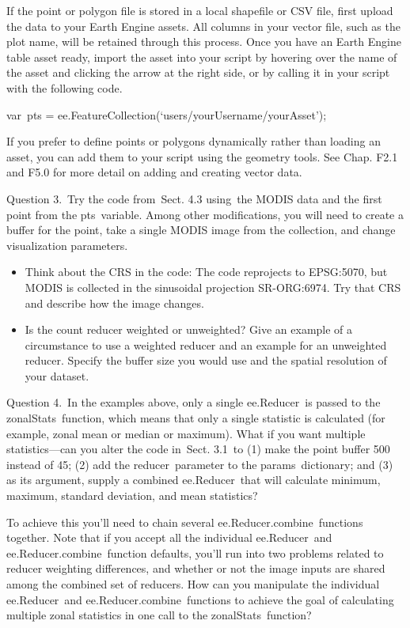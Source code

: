 \documentclass[
  letterpaper,
  DIV=11,
  numbers=noendperiod]{scrreprt}
\providecommand{\tightlist}{%
  \setlength{\itemsep}{0pt}\setlength{\parskip}{0pt}}\usepackage{longtable,booktabs,array}
\begin{document}
If the point or polygon file is stored in a local shapefile or CSV file,
first upload the data to your Earth Engine assets. All columns in your
vector file, such as the plot name, will be retained through this
process. Once you have an Earth Engine table asset ready, import the
asset into your script by hovering over the name of the asset and
clicking the arrow at the right side, or by calling it in your script
with the following code.

var~pts = ee.FeatureCollection(`users/yourUsername/yourAsset');

If you prefer to define points or polygons dynamically rather than
loading an asset, you can add them to your script using the geometry
tools. See Chap. F2.1 and F5.0 for more detail on adding and creating
vector data.

Question 3.~Try the code from~Sect. 4.3 using~the MODIS data and the
first point from the pts~variable. Among other modifications, you will
need to create a buffer for the point, take a single MODIS image from
the collection, and change visualization parameters.

\begin{itemize}
\tightlist
\item
  Think about the CRS in the code: The code reprojects to EPSG:5070, but
  MODIS is collected in the sinusoidal projection SR-ORG:6974. Try that
  CRS and describe how the image changes.
\item
  Is the count reducer weighted or unweighted? Give an example of a
  circumstance to use a weighted reducer and an example for an
  unweighted reducer. Specify the buffer size you would use and the
  spatial resolution of your dataset.
\end{itemize}

Question 4.~In the examples above, only a single ee.Reducer~is passed to
the zonalStats~function, which means that only a single statistic is
calculated (for example, zonal mean or median or maximum). What if you
want multiple statistics---can you alter the code in~Sect. 3.1~to (1)
make the point buffer 500 instead of 45; (2) add the reducer~parameter
to the params~dictionary; and (3) as its argument, supply a combined
ee.Reducer~that will calculate minimum, maximum, standard deviation, and
mean statistics?

To achieve this you'll need to chain several
ee.Reducer.combine~functions together. Note that if you accept all the
individual ee.Reducer~and ee.Reducer.combine~function defaults, you'll
run into two problems related to reducer weighting differences, and
whether or not the image inputs are shared among the combined set of
reducers. How can you manipulate the individual ee.Reducer~and
ee.Reducer.combine~functions to achieve the goal of calculating multiple
zonal statistics in one call to the zonalStats~function?
\end{document}
